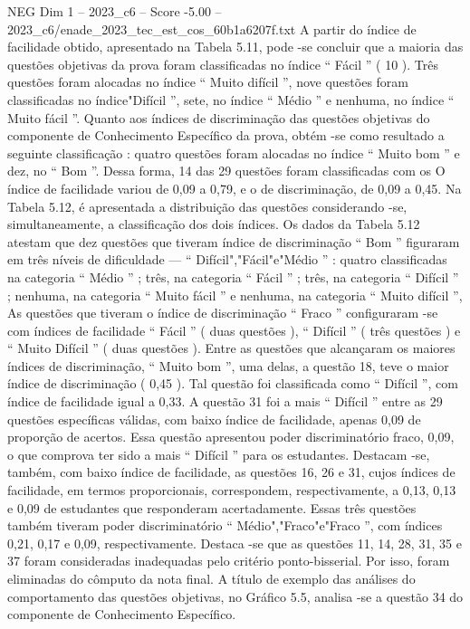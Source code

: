 \begin{textsample}{NEG Dim 1 – 2023\_c6 – Score -5.00 – 2023\_c6/enade\_2023\_tec\_est\_cos\_60b1a6207f.txt}
A partir do índice de facilidade obtido, apresentado na Tabela 5.11, pode -se concluir que a maioria das questões objetivas da prova foram classificadas no índice “ Fácil ” ( 10 ).
Três questões foram alocadas no índice “ Muito difícil ”, nove questões foram classificadas no índice"Difícil ”, sete, no índice “ Médio ” e nenhuma, no índice “ Muito fácil ”.
Quanto aos índices de discriminação das questões objetivas do componente de Conhecimento Específico da prova, obtém -se como resultado a seguinte classificação : quatro questões foram alocadas no índice “ Muito bom ” e dez, no “ Bom ”.
Dessa forma, 14 das 29 questões foram classificadas com os O índice de facilidade variou de 0,09 a 0,79, e o de discriminação, de 0,09 a 0,45.
Na Tabela 5.12, é apresentada a distribuição das questões considerando -se, simultaneamente, a classificação dos dois índices.
Os dados da Tabela 5.12 atestam que dez questões que tiveram índice de discriminação “ Bom ” figuraram em três níveis de dificuldade — “ Difícil","Fácil"e"Médio ” : quatro classificadas na categoria “ Médio ” ; três, na categoria “ Fácil ” ; três, na categoria “ Difícil ” ; nenhuma, na categoria “ Muito fácil ” e nenhuma, na categoria “ Muito difícil ”, As questões que tiveram o índice de discriminação “ Fraco ” configuraram -se com índices de facilidade “ Fácil ” ( duas questões ), “ Difícil ” ( três questões ) e “ Muito Difícil ” ( duas questões ).
Entre as questões que alcançaram os maiores índices de discriminação, “ Muito bom ”, uma delas, a questão 18, teve o maior índice de discriminação ( 0,45 ).
Tal questão foi classificada como “ Difícil ”, com índice de facilidade igual a 0,33.
A questão 31 foi a mais “ Difícil ” entre as 29 questões específicas válidas, com baixo índice de facilidade, apenas 0,09 de proporção de acertos.
Essa questão apresentou poder discriminatório fraco, 0,09, o que comprova ter sido a mais “ Difícil ” para os estudantes.
Destacam -se, também, com baixo índice de facilidade, as questões 16, 26 e 31, cujos índices de facilidade, em termos proporcionais, correspondem, respectivamente, a 0,13, 0,13 e 0,09 de estudantes que responderam acertadamente.
Essas três questões também tiveram poder discriminatório “ Médio","Fraco"e"Fraco ”, com índices 0,21, 0,17 e 0,09, respectivamente.
Destaca -se que as questões 11, 14, 28, 31, 35 e 37 foram consideradas inadequadas pelo critério ponto-bisserial.
Por isso, foram eliminadas do cômputo da nota final.
A título de exemplo das análises do comportamento das questões objetivas, no Gráfico 5.5, analisa -se a questão 34 do componente de Conhecimento Específico.

\end{textsample}
